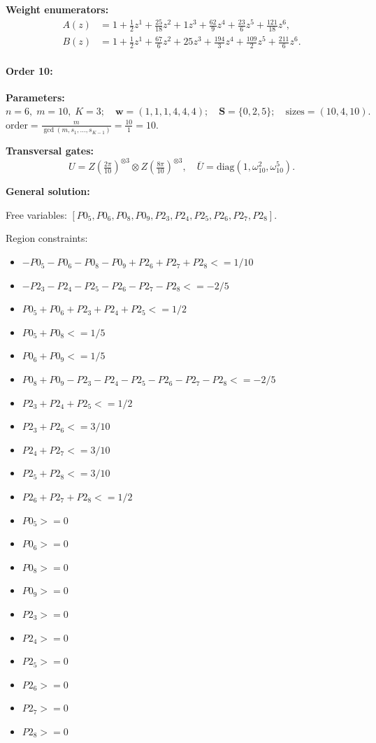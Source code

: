 \documentclass[11pt]{article}
\begin{document}
\noindent\textbf{Weight enumerators:}
\begin{align*}
A(z) &= 1 + \tfrac{1}{2}z^{1} + \tfrac{25}{18}z^{2} + 1z^{3} + \tfrac{62}{9}z^{4} + \tfrac{23}{6}z^{5} + \tfrac{121}{18}z^{6},\\[2pt]
B(z) &= 1 + \tfrac{1}{2}z^{1} + \tfrac{67}{6}z^{2} + 25z^{3} + \tfrac{194}{3}z^{4} + \tfrac{109}{2}z^{5} + \tfrac{211}{6}z^{6}.
\end{align*}

\paragraph{\textbf{Order 10:}}
\noindent\textbf{Parameters:} $n=6,\; m=10,\; K=3;\quad \mathbf w=(1, 1, 1, 4, 4, 4);\quad \mathbf S=\{0, 2, 5\};\quad \text{sizes}=\left(10, 4, 10\right).$ $\displaystyle \text{order}=\frac{m}{\gcd(m,s_1,\dots,s_{K-1})}=\frac{10}{1}=10.$

\noindent\textbf{Transversal gates:}
\[
    U=Z \left(\tfrac{2\pi}{10}\right)^{\otimes3} \otimes Z \left(\tfrac{8\pi}{10}\right)^{\otimes3},\quad
    \overline U=\mathrm{diag}(1,\omega_{10}^{2},\omega_{10}^{5}).
\]

\noindent\textbf{General solution:}

Free variables: $[P0_5, P0_6, P0_8, P0_9, P2_3, P2_4, P2_5, P2_6, P2_7, P2_8]$.

Region constraints:
\begin{itemize}
    \item $-P0_5 - P0_6 - P0_8 - P0_9 + P2_6 + P2_7 + P2_8 <= 1/10$
    \item $-P2_3 - P2_4 - P2_5 - P2_6 - P2_7 - P2_8 <= -2/5$
    \item $P0_5 + P0_6 + P2_3 + P2_4 + P2_5 <= 1/2$
    \item $P0_5 + P0_8 <= 1/5$
    \item $P0_6 + P0_9 <= 1/5$
    \item $P0_8 + P0_9 - P2_3 - P2_4 - P2_5 - P2_6 - P2_7 - P2_8 <= -2/5$
    \item $P2_3 + P2_4 + P2_5 <= 1/2$
    \item $P2_3 + P2_6 <= 3/10$
    \item $P2_4 + P2_7 <= 3/10$
    \item $P2_5 + P2_8 <= 3/10$
    \item $P2_6 + P2_7 + P2_8 <= 1/2$
    \item $P0_5 >= 0$
    \item $P0_6 >= 0$
    \item $P0_8 >= 0$
    \item $P0_9 >= 0$
    \item $P2_3 >= 0$
    \item $P2_4 >= 0$
    \item $P2_5 >= 0$
    \item $P2_6 >= 0$
    \item $P2_7 >= 0$
    \item $P2_8 >= 0$
\end{itemize}
\end{document}
